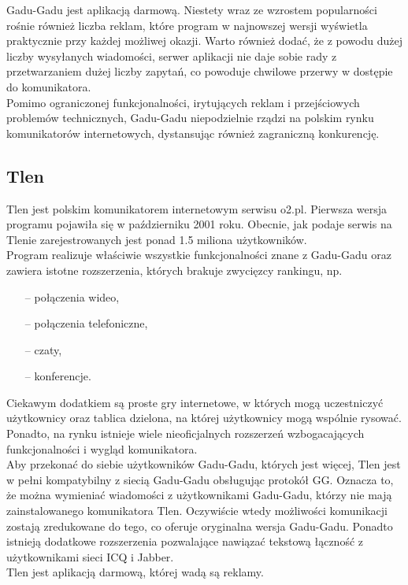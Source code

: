 \documentclass[a4paper,12pt]{article}
\begin{document}
Gadu-Gadu jest aplikacją darmową. Niestety wraz ze wzrostem popularności rośnie również liczba reklam, które program w najnowszej wersji wyświetla praktycznie przy każdej możliwej okazji. Warto również dodać, że z powodu dużej liczby wysyłanych wiadomości, serwer aplikacji nie daje sobie rady z przetwarzaniem dużej liczby zapytań, co powoduje chwilowe przerwy w dostępie do komunikatora.\\
Pomimo ograniczonej funkcjonalności, irytujących reklam i przejściowych problemów technicznych, Gadu-Gadu niepodzielnie rządzi na polskim rynku komunikatorów internetowych, dystansując również zagraniczną konkurencję.

\subsection[Tlen]{Tlen}
Tlen jest polskim komunikatorem internetowym serwisu o2.pl. Pierwsza wersja programu pojawiła się w październiku 2001 roku. Obecnie, jak podaje serwis \cite{TL} na Tlenie zarejestrowanych jest ponad 1.5 miliona użytkowników.\\
Program realizuje właściwie wszystkie funkcjonalności znane z Gadu-Gadu oraz zawiera istotne rozszerzenia, których brakuje zwycięzcy rankingu, np.
\begin{itemize}
    \item[--] połączenia wideo,
    \item[--] połączenia telefoniczne,
    \item[--] czaty,
    \item[--] konferencje.
\end{itemize}
Ciekawym dodatkiem są proste gry internetowe, w których mogą uczestniczyć użytkownicy oraz tablica dzielona, na której użytkownicy mogą wspólnie rysować. Ponadto, na rynku istnieje wiele nieoficjalnych rozszerzeń wzbogacających funkcjonalności i wygląd komunikatora.\\
Aby przekonać do siebie użytkowników Gadu-Gadu, których jest więcej, Tlen jest w pełni kompatybilny z siecią Gadu-Gadu obsługując protokół GG. Oznacza to, że można wymieniać wiadomości z użytkownikami Gadu-Gadu, którzy nie mają zainstalowanego komunikatora Tlen. Oczywiście wtedy możliwości komunikacji zostają zredukowane do tego, co oferuje oryginalna wersja Gadu-Gadu. Ponadto istnieją dodatkowe rozszerzenia pozwalające nawiązać tekstową łączność z użytkownikami sieci ICQ i Jabber.\\
Tlen jest aplikacją darmową, której wadą są reklamy.
\end{document}
